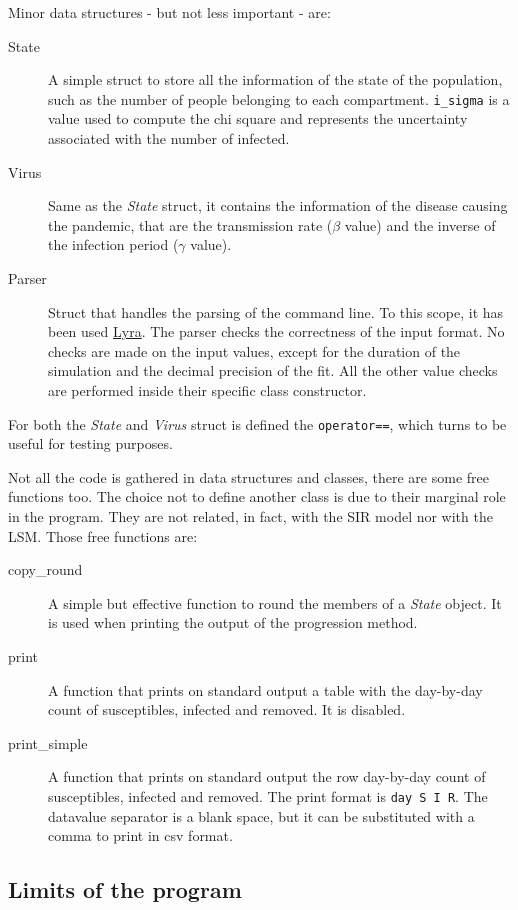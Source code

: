 Minor data structures - but not less important - are:
\begin{description}
\item[State] A simple struct to store all the information of the state of the population, such as the number of people belonging to each compartment. \verb!i_sigma! is a value used to compute the chi square and represents the uncertainty associated with the number of infected. 
\item[Virus] Same as the \emph{State} struct, it contains the information of the disease causing the pandemic, that are the transmission rate ($\beta$ value) and the inverse of the infection  period ($\gamma$ value).
\item[Parser] Struct that handles the parsing of the command line. To this scope, it has been used \href{https://www.bfgroup.xyz/Lyra/}{Lyra}. The parser checks the correctness of the input format. No checks are made on the input values, except for the duration of the simulation and the decimal precision of the fit. All the other value checks are performed inside their specific class constructor.
\end{description}

For both the \emph{State} and \emph{Virus} struct is defined the \verb!operator==!, which turns to be useful for testing purposes.

Not all the code is gathered in data structures and classes, there are some free functions too. The choice not to define another class is due to their marginal role in the program. They are not related, in fact, with the SIR model nor with the LSM. Those free functions are:
\begin{description}
\item[copy\_round] A simple but effective function to round the members of a \emph{State} object. It is used when printing the output of the progression method.
\item[print] A function that prints on standard output a table with the day-by-day count of susceptibles, infected and removed. It is disabled.
\item[print\_simple] A function that prints on standard output the row day-by-day count of susceptibles, infected and removed. The print format is \verb!day S I R!. The datavalue separator is a blank space, but it can be substituted with a comma to print in csv format.
\end{description}

\subsection{Limits of the program}

